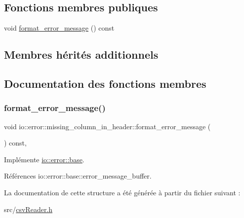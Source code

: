 \subsection*{Fonctions membres publiques}
\begin{DoxyCompactItemize}
\item 
void \hyperlink{structio_1_1error_1_1missing__column__in__header_a1a2bd4e01a389cb50c6bfae8443317fd}{format\+\_\+error\+\_\+message} () const
\end{DoxyCompactItemize}
\subsection*{Membres hérités additionnels}


\subsection{Documentation des fonctions membres}
\mbox{\label{structio_1_1error_1_1missing__column__in__header_a1a2bd4e01a389cb50c6bfae8443317fd}} 
\subsubsection{\texorpdfstring{format\+\_\+error\+\_\+message()}{format\_error\_message()}}
{\footnotesize\ttfamily void io\+::error\+::missing\+\_\+column\+\_\+in\+\_\+header\+::format\+\_\+error\+\_\+message (\begin{DoxyParamCaption}{ }\end{DoxyParamCaption}) const\hspace{0.3cm}{\ttfamily [inline]}, {\ttfamily [virtual]}}



Implémente \hyperlink{structio_1_1error_1_1base_a7d9ff6a31b716a24f056cf8a3e15191d}{io\+::error\+::base}.



Références io\+::error\+::base\+::error\+\_\+message\+\_\+buffer.



La documentation de cette structure a été générée à partir du fichier suivant \+:\begin{DoxyCompactItemize}
\item 
src/\hyperlink{csvReader_8h}{csv\+Reader.\+h}\end{DoxyCompactItemize}
